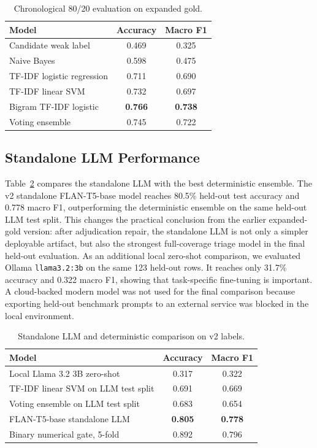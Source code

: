 \documentclass[conference]{IEEEtran}
\begin{document}
\begin{table}[t]
\centering
\caption{Chronological 80/20 evaluation on expanded gold.}
\label{tab:time}
\begin{tabular}{lcc}
\toprule
Model & Accuracy & Macro F1 \\
\midrule
Candidate weak label & 0.469 & 0.325 \\
Naive Bayes & 0.598 & 0.475 \\
TF-IDF logistic regression & 0.711 & 0.690 \\
TF-IDF linear SVM & 0.732 & 0.697 \\
Bigram TF-IDF logistic & \textbf{0.766} & \textbf{0.738} \\
Voting ensemble & 0.745 & 0.722 \\
\bottomrule
\end{tabular}
\end{table}

\subsection{Standalone LLM Performance}

Table~\ref{tab:llm} compares the standalone LLM with the best deterministic
ensemble. The v2 standalone FLAN-T5-base model reaches 80.5\% held-out test
accuracy and 0.778 macro F1, outperforming the deterministic ensemble on the
same held-out LLM test split. This changes the practical conclusion from the
earlier expanded-gold version: after adjudication repair, the standalone LLM is
not only a simpler deployable artifact, but also the strongest full-coverage
triage model in the final held-out evaluation. As an additional local
zero-shot comparison, we evaluated Ollama \texttt{llama3.2:3b} on the same 123
held-out rows. It reaches only 31.7\% accuracy and 0.322 macro F1, showing
that task-specific fine-tuning is important. A cloud-backed modern model was
not used for the final comparison because exporting held-out benchmark prompts
to an external service was blocked in the local environment.

\begin{table}[t]
\centering
\caption{Standalone LLM and deterministic comparison on v2 labels.}
\label{tab:llm}
\begin{tabular}{lcc}
\toprule
Model & Accuracy & Macro F1 \\
\midrule
Local Llama 3.2 3B zero-shot & 0.317 & 0.322 \\
TF-IDF linear SVM on LLM test split & 0.691 & 0.669 \\
Voting ensemble on LLM test split & 0.683 & 0.654 \\
FLAN-T5-base standalone LLM & \textbf{0.805} & \textbf{0.778} \\
Binary numerical gate, 5-fold & 0.892 & 0.796 \\
\bottomrule
\end{tabular}
\end{table}
\end{document}

